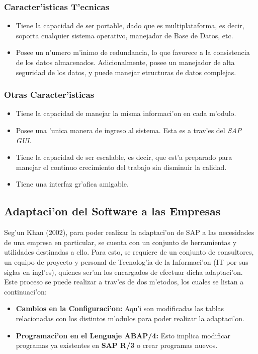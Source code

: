 \subsubsection*{Caracter'isticas T'ecnicas}
\begin{itemize}
\item Tiene la capacidad de ser portable, dado que es multiplataforma, es decir, soporta cualquier sistema operativo, manejador de Base de Datos, etc.
\item Posee un n'umero m'inimo de redundancia, lo que favorece a la consistencia de los datos almacenados. Adicionalmente, posee un manejador de alta seguridad de los datos, y puede manejar etructuras de datos complejas.
\end{itemize}

\subsubsection*{Otras Caracter'isticas}
\begin{itemize}
\item Tiene la capacidad de manejar la misma informaci'on en cada m'odulo.
\item Posee una 'unica manera de ingreso al sistema. Esta es a trav'es del \textit{SAP GUI}.
\item Tiene la capacidad de ser escalable, es decir, que est'a preparado para manejar el continuo crecimiento del trabajo sin disminuir la calidad.
\item Tiene una interfaz gr'afica amigable.
\end{itemize}

\subsection{Adaptaci'on del Software a las Empresas}
Seg'un Khan (2002), para poder realizar la adaptaci'on de SAP a las necesidades de una empresa en particular, se cuenta con un conjunto de herramientas y utilidades destinadas a ello. Para esto, se requiere de un conjunto de consultores, un equipo de proyecto y personal de Tecnolog'ia de la Informaci'on (IT por sus siglas en ingl'es), quienes ser'an los encargados de efectuar dicha adaptaci'on. 
\newline
\newline
Este proceso se puede realizar a trav'es de dos m'etodos, los cuales se listan a continuaci'on:

\begin{itemize}
\item \textbf{Cambios en la Configuraci'on:} Aqu'i son modificadas las tablas relacionadas con los distintos m'odulos para poder realizar la adaptaci'on.
\item \textbf{Programaci'on en el Lenguaje ABAP/4:} Esto implica modificar programas ya existentes en \textbf{SAP R/3} o crear programas nuevos.
\end{itemize}


